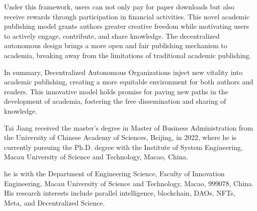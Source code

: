 \documentclass[lettersize,journal]{IEEEtran}
\begin{document}
Under this framework, users can not only pay for paper downloads but also receive rewards through participation in financial activities. This novel academic publishing model grants authors greater creative freedom while motivating users to actively engage, contribute, and share knowledge. The decentralized autonomous design brings a more open and fair publishing mechanism to academia, breaking away from the limitations of traditional academic publishing.

In summary, Decentralized Autonomous Organizations inject new vitality into academic publishing, creating a more equitable environment for both authors and readers. This innovative model holds promise for paving new paths in the development of academia, fostering the free dissemination and sharing of knowledge.








\newpage

 

\begin{IEEEbiography}{Tai Jiang}
  received the master’s degree in Master of Business Administration from the University of Chinese Academy of Sciences, Beijing, in 2022, where he is currently pursuing the Ph.D. degree with the Institute of System Engineering, Macau University of Science and Technology, Macao, China.
  
  he is with the Department of Engineering Science, Faculty of Innovation Engineering, Macau University of Science and Technology, Macao, 999078, China. His research interests include parallel intelligence, blockchain, DAOs, NFTs, Meta, and Decentralized Science.
\end{IEEEbiography}
\end{document}
